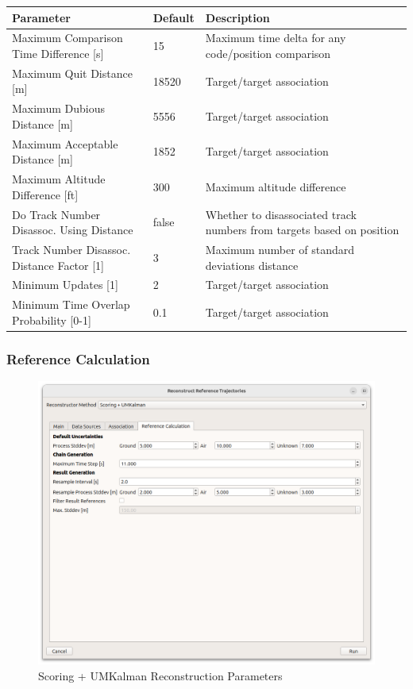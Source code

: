 \begin{table}[H]
  \center
  \begin{tabularx}{\textwidth}{ | l | l | X |}
    \hline
    \textbf{Parameter} & \textbf{Default} &  \textbf{Description} \\ \hline
    Maximum Comparison Time Difference [s] & 15 & Maximum time delta for any code/position comparison \\ \hline
    Maximum Quit Distance [m] & 18520 & Target/target association \\ \hline
    Maximum Dubious Distance [m] & 5556 & Target/target association \\ \hline
    Maximum Acceptable Distance [m] & 1852 & Target/target association \\ \hline
    Maximum Altitude Difference [ft] & 300 & Maximum altitude difference \\ \hline
    Do Track Number Disassoc. Using Distance & false & Whether to disassociated track numbers from targets based on position \\ \hline
    Track Number Disassoc. Distance Factor [1] & 3 & Maximum number of standard deviations distance \\ \hline
    Minimum Updates [1] & 2 & Target/target association \\ \hline
    Minimum Time Overlap Probability [0-1] & 0.1 & Target/target association \\ \hline
  \end{tabularx}
\end{table}

\subsubsection{Reference Calculation}
\label{sec:reconst_scorum_ref_calc} 

\begin{figure}[H]
    \center
      \includegraphics[width=16cm]{figures/dialog_ref_calc.png}
    \caption{Scoring + UMKalman Reconstruction Parameters}
\end{figure}

